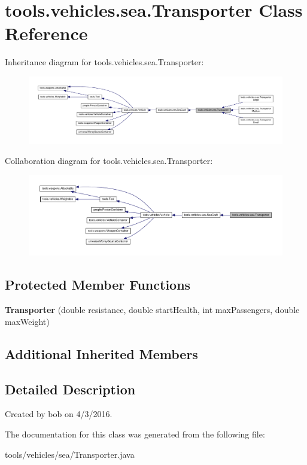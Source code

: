 \hypertarget{classtools_1_1vehicles_1_1sea_1_1_transporter}{}\section{tools.\+vehicles.\+sea.\+Transporter Class Reference}
\label{classtools_1_1vehicles_1_1sea_1_1_transporter}


Inheritance diagram for tools.\+vehicles.\+sea.\+Transporter\+:
\nopagebreak
\begin{figure}[H]
\begin{center}
\leavevmode
\includegraphics[width=350pt]{classtools_1_1vehicles_1_1sea_1_1_transporter__inherit__graph}
\end{center}
\end{figure}


Collaboration diagram for tools.\+vehicles.\+sea.\+Transporter\+:
\nopagebreak
\begin{figure}[H]
\begin{center}
\leavevmode
\includegraphics[width=350pt]{classtools_1_1vehicles_1_1sea_1_1_transporter__coll__graph}
\end{center}
\end{figure}
\subsection*{Protected Member Functions}
\begin{DoxyCompactItemize}
\item 
{\bfseries Transporter} (double resistance, double start\+Health, int max\+Passengers, double max\+Weight)\hypertarget{classtools_1_1vehicles_1_1sea_1_1_transporter_af5c22a729b4b127476d7ce06663d4647}{}\label{classtools_1_1vehicles_1_1sea_1_1_transporter_af5c22a729b4b127476d7ce06663d4647}

\end{DoxyCompactItemize}
\subsection*{Additional Inherited Members}


\subsection{Detailed Description}
Created by bob on 4/3/2016. 

The documentation for this class was generated from the following file\+:\begin{DoxyCompactItemize}
\item 
tools/vehicles/sea/Transporter.\+java\end{DoxyCompactItemize}
